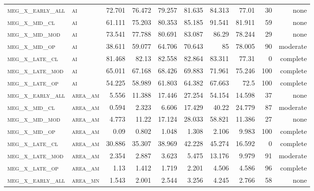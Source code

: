 \begin{landscape}
\begin{center}
\begin{footnotesize}
\begin{longtable}{llrrrrr|rrr}
\textsc{meg\_x\_early\_all} & \textsc{ai        }    & 72.701   & 76.472   & 79.257   & 81.635   & 84.313   & 77.01    & 30  & none     \\
\textsc{meg\_x\_mid\_cl   } & \textsc{ai        }    & 61.111   & 75.203   & 80.353   & 85.185   & 91.541   & 81.911   & 59  & none     \\
\textsc{meg\_x\_mid\_mod  } & \textsc{ai        }    & 73.541   & 77.788   & 80.691   & 83.087   & 86.29    & 78.244   & 29  & none     \\
\textsc{meg\_x\_mid\_op   } & \textsc{ai        }    & 38.611   & 59.077   & 64.706   & 70.643   & 85       & 78.005   & 90  & moderate \\
\textsc{meg\_x\_late\_cl  } & \textsc{ai        }    & 81.468   & 82.13    & 82.558   & 82.864   & 83.311   & 77.31    & 0   & complete \\
\textsc{meg\_x\_late\_mod } & \textsc{ai        }    & 65.011   & 67.168   & 68.426   & 69.883   & 71.961   & 75.246   & 100 & complete \\
\textsc{meg\_x\_late\_op  } & \textsc{ai        }    & 54.225   & 58.989   & 61.803   & 64.382   & 67.663   & 72.5     & 100 & complete \\
\textsc{meg\_x\_early\_all} & \textsc{area\_am  }    & 5.556    & 11.388   & 17.446   & 27.254   & 54.154   & 14.598   & 37  & none     \\
\textsc{meg\_x\_mid\_cl   } & \textsc{area\_am  }    & 0.594    & 2.323    & 6.606    & 17.429   & 40.22    & 24.779   & 87  & moderate \\
\textsc{meg\_x\_mid\_mod  } & \textsc{area\_am  }    & 4.773    & 11.22    & 17.124   & 28.033   & 58.821   & 11.386   & 27  & none     \\
\textsc{meg\_x\_mid\_op   } & \textsc{area\_am  }    & 0.09     & 0.802    & 1.048    & 1.308    & 2.106    & 9.983    & 100 & complete \\
\textsc{meg\_x\_late\_cl  } & \textsc{area\_am  }    & 30.886   & 35.307   & 38.969   & 42.228   & 45.274   & 16.592   & 0   & complete \\
\textsc{meg\_x\_late\_mod } & \textsc{area\_am  }    & 2.354    & 2.887    & 3.623    & 5.475    & 13.176   & 9.979    & 91  & moderate \\
\textsc{meg\_x\_late\_op  } & \textsc{area\_am  }    & 1.13     & 1.412    & 1.719    & 2.201    & 4.506    & 4.586    & 96  & complete \\
\textsc{meg\_x\_early\_all} & \textsc{area\_mn  }    & 1.543    & 2.001    & 2.544    & 3.256    & 4.245    & 2.766    & 58  & none     \\

\end{longtable}
\end{footnotesize}
\end{center}
\end{landscape}
